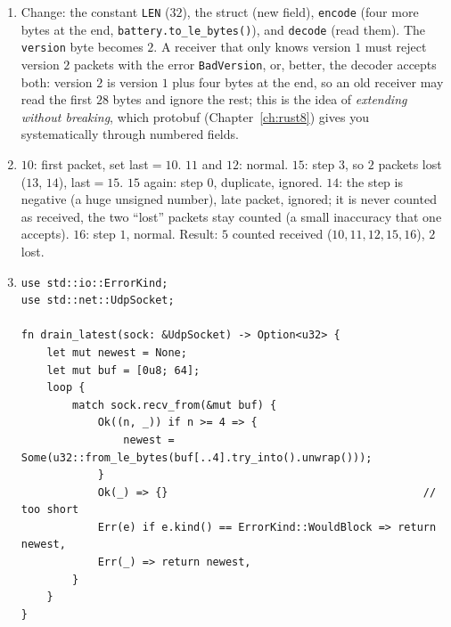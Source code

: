 \begin{enumerate}[label=\textbf{\ansnum.\arabic*}]
\begin{verbatim}
fn main() -> std::io::Result<()> {
    let s = UdpSocket::bind("127.0.0.1:0")?;
    s.send_to(b"hello", s.local_addr()?)?;
    let mut buf = [0u8; 64];
    let (n, from) = s.recv_from(&mut buf)?;
    println!("{} from same socket: {}",
             String::from_utf8_lossy(&buf[..n]), from == s.local_addr()?);
    Ok(())
}
\end{verbatim}
prints \verb!hello from same socket: true!. The datagram is queued in the socket's own receive buffer, so no second thread is needed.
  \item Change: the constant \verb!LEN! ($32$), the struct (new field), \verb!encode! (four more bytes at the end, \verb!battery.to_le_bytes()!), and \verb!decode! (read them). The \verb!version! byte becomes $2$. A receiver that only knows version $1$ must reject version $2$ packets with the error \verb!BadVersion!, or, better, the decoder accepts both: version $2$ is version $1$ plus four bytes at the end, so an old receiver may read the first $28$ bytes and ignore the rest; this is the idea of \emph{extending without breaking}, which protobuf (Chapter~\ref{ch:rust8}) gives you systematically through numbered fields.
  \item $10$: first packet, set last$=10$. $11$ and $12$: normal. $15$: step $3$, so $2$ packets lost ($13$, $14$), last$=15$. $15$ again: step $0$, duplicate, ignored. $14$: the step is negative (a huge unsigned number), late packet, ignored; it is never counted as received, the two ``lost'' packets stay counted (a small inaccuracy that one accepts). $16$: step $1$, normal. Result: $5$ counted received ($10,11,12,15,16$), $2$ lost.
  \item
\begin{verbatim}
use std::io::ErrorKind;
use std::net::UdpSocket;

fn drain_latest(sock: &UdpSocket) -> Option<u32> {
    let mut newest = None;
    let mut buf = [0u8; 64];
    loop {
        match sock.recv_from(&mut buf) {
            Ok((n, _)) if n >= 4 => {
                newest = Some(u32::from_le_bytes(buf[..4].try_into().unwrap()));
            }
            Ok(_) => {}                                        // too short
            Err(e) if e.kind() == ErrorKind::WouldBlock => return newest,
            Err(_) => return newest,
        }
    }
}


\end{verbatim}
\end{enumerate}

